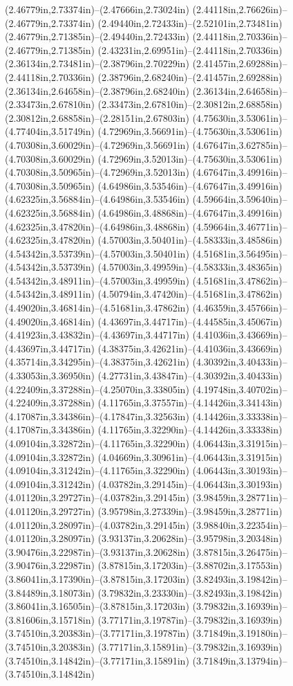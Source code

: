 (2.46779in,2.73374in)--(2.47666in,2.73024in) (2.44118in,2.76626in)--(2.46779in,2.73374in) (2.49440in,2.72433in)--(2.52101in,2.73481in) (2.46779in,2.71385in)--(2.49440in,2.72433in) (2.44118in,2.70336in)--(2.46779in,2.71385in) (2.43231in,2.69951in)--(2.44118in,2.70336in) (2.36134in,2.73481in)--(2.38796in,2.70229in) (2.41457in,2.69288in)--(2.44118in,2.70336in) (2.38796in,2.68240in)--(2.41457in,2.69288in) (2.36134in,2.64658in)--(2.38796in,2.68240in) (2.36134in,2.64658in)--(2.33473in,2.67810in) (2.33473in,2.67810in)--(2.30812in,2.68858in) (2.30812in,2.68858in)--(2.28151in,2.67803in) (4.75630in,3.53061in)--(4.77404in,3.51749in) (4.72969in,3.56691in)--(4.75630in,3.53061in) (4.70308in,3.60029in)--(4.72969in,3.56691in) (4.67647in,3.62785in)--(4.70308in,3.60029in) (4.72969in,3.52013in)--(4.75630in,3.53061in) (4.70308in,3.50965in)--(4.72969in,3.52013in) (4.67647in,3.49916in)--(4.70308in,3.50965in) (4.64986in,3.53546in)--(4.67647in,3.49916in) (4.62325in,3.56884in)--(4.64986in,3.53546in) (4.59664in,3.59640in)--(4.62325in,3.56884in) (4.64986in,3.48868in)--(4.67647in,3.49916in) (4.62325in,3.47820in)--(4.64986in,3.48868in) (4.59664in,3.46771in)--(4.62325in,3.47820in) (4.57003in,3.50401in)--(4.58333in,3.48586in) (4.54342in,3.53739in)--(4.57003in,3.50401in) (4.51681in,3.56495in)--(4.54342in,3.53739in) (4.57003in,3.49959in)--(4.58333in,3.48365in) (4.54342in,3.48911in)--(4.57003in,3.49959in) (4.51681in,3.47862in)--(4.54342in,3.48911in) (4.50794in,3.47420in)--(4.51681in,3.47862in) (4.49020in,3.46814in)--(4.51681in,3.47862in) (4.46359in,3.45766in)--(4.49020in,3.46814in) (4.43697in,3.44717in)--(4.44585in,3.45067in) (4.41923in,3.43832in)--(4.43697in,3.44717in) (4.41036in,3.43669in)--(4.43697in,3.44717in) (4.38375in,3.42621in)--(4.41036in,3.43669in) (4.35714in,3.34295in)--(4.38375in,3.42621in) (4.30392in,3.40433in)--(4.33053in,3.36950in) (4.27731in,3.43847in)--(4.30392in,3.40433in) (4.22409in,3.37288in)--(4.25070in,3.33805in) (4.19748in,3.40702in)--(4.22409in,3.37288in) (4.11765in,3.37557in)--(4.14426in,3.34143in) (4.17087in,3.34386in)--(4.17847in,3.32563in) (4.14426in,3.33338in)--(4.17087in,3.34386in) (4.11765in,3.32290in)--(4.14426in,3.33338in) (4.09104in,3.32872in)--(4.11765in,3.32290in) (4.06443in,3.31915in)--(4.09104in,3.32872in) (4.04669in,3.30961in)--(4.06443in,3.31915in) (4.09104in,3.31242in)--(4.11765in,3.32290in) (4.06443in,3.30193in)--(4.09104in,3.31242in) (4.03782in,3.29145in)--(4.06443in,3.30193in) (4.01120in,3.29727in)--(4.03782in,3.29145in) (3.98459in,3.28771in)--(4.01120in,3.29727in) (3.95798in,3.27339in)--(3.98459in,3.28771in) (4.01120in,3.28097in)--(4.03782in,3.29145in) (3.98840in,3.22354in)--(4.01120in,3.28097in) (3.93137in,3.20628in)--(3.95798in,3.20348in) (3.90476in,3.22987in)--(3.93137in,3.20628in) (3.87815in,3.26475in)--(3.90476in,3.22987in) (3.87815in,3.17203in)--(3.88702in,3.17553in) (3.86041in,3.17390in)--(3.87815in,3.17203in) (3.82493in,3.19842in)--(3.84489in,3.18073in) (3.79832in,3.23330in)--(3.82493in,3.19842in) (3.86041in,3.16505in)--(3.87815in,3.17203in) (3.79832in,3.16939in)--(3.81606in,3.15718in) (3.77171in,3.19787in)--(3.79832in,3.16939in) (3.74510in,3.20383in)--(3.77171in,3.19787in) (3.71849in,3.19180in)--(3.74510in,3.20383in) (3.77171in,3.15891in)--(3.79832in,3.16939in) (3.74510in,3.14842in)--(3.77171in,3.15891in) (3.71849in,3.13794in)--(3.74510in,3.14842in) 